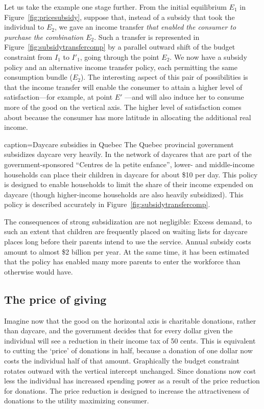 Let us take the example one stage further. From the initial equilibrium 
$E_{1}$ in Figure~\ref{fig:pricesubsidy}, suppose that, instead of a subsidy
that took the individual to $E_{2}$, we gave an income transfer \textit{that
	enabled the consumer to purchase the combination $E_{2}$}. Such a transfer
is represented in Figure~\ref{fig:subsidytransfercomp} by a parallel outward
shift of the budget constraint from $I_{1}$ to $I'_{1}$, going
through the point $E_{2}$. We now have a
subsidy policy and an alternative income transfer policy, each permitting
the same consumption bundle ($E_{2}$). The interesting aspect of this pair
of possibilities is that the income transfer will enable the consumer to
attain a higher level of satisfaction---for example, at point $E'$%
---and will also induce her to consume more of the good on the vertical
axis. The higher level of satisfaction comes about because the consumer has
more latitude in allocating the additional real income.

\newhtmlpage

\begin{ApplicationBox}{caption={Daycare subsidies in Quebec \label{app:daycarequebec}}}
	The Quebec provincial government subsidizes daycare very heavily. In the network of daycares that are part of the government-sponsored ``Centres de la petite enfance'', lower- and middle-income households can place their children in daycare for about \$10 per day. This policy is designed to enable households to limit the share of their income expended on daycare (though higher-income households are also heavily subsidized). This policy is described accurately in Figure~\ref{fig:subsidytransfercomp}.
	
	The consequences of strong subsidization are not negligible: Excess demand, to such an extent that children are frequently placed on waiting lists for daycare places long before their parents intend to use the service. Annual subsidy costs amount to almost \$2 billion per year. At the same time, it has been estimated that the policy has enabled many more parents to enter the workforce than otherwise would have. 
\end{ApplicationBox}



\newhtmlpage

\subsection*{The price of giving}

Imagine now that the good on the horizontal axis is charitable donations,
rather than daycare, and the government decides that for every dollar given
the individual will see a reduction in their income tax of 50 cents. This is
equivalent to cutting the `price' of donations in half, because a donation
of one dollar now costs the individual half of that amount. Graphically the
budget constraint rotates outward with the vertical intercept unchanged.
Since donations now cost less the individual has increased spending power as
a result of the price reduction for donations. The price reduction is
designed to increase the attractiveness of donations to the utility
maximizing consumer.